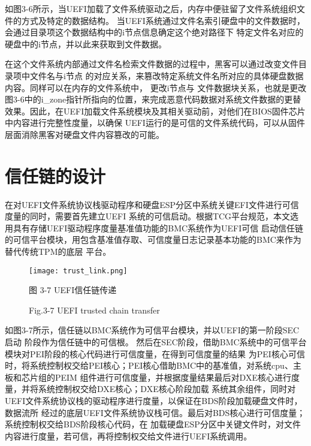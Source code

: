 如图3-6所示，当UEFI加载了文件系统驱动之后，内存中便驻留了文件系统组织文件的方式及特定的数据结构。
当UEFI系统通过文件名索引硬盘中的文件数据时，会通过目录项这个数据结构中的i节点信息确定这个绝对路径下
特定文件名对应的硬盘中的i节点，并以此来获取到文件数据。
\par 在这个文件系统内部通过文件名检索文件数据的过程中，黑客可以通过改变文件目录项中文件名与i节点
的对应关系，来篡改特定系统文件名所对应的具体硬盘数据内容\cite{chinese15}。同样可以在内存的文件系统中，
更改i节点与
文件数据块关系，也就是更改图3-6中的i\_zone指针所指向的位置，来完成恶意代码数据对系统文件数据的更替
效果。因此，在UEFI加载文件系统模块及其相关驱动前，对他们在BIOS固件芯片中内容进行完整性度量，以确保
UEFI运行的是可信的文件系统代码，可以从固件层面消除黑客对硬盘文件内容篡改的可能。

%
%
\section{信任链的设计}
在对UEFI文件系统协议栈驱动程序和硬盘ESP分区中系统关键EFI文件进行可信度量的同时，需要首先建立UEFI
系统的可信启动。根据TCG平台规范，本文选用具有存储UEFI驱动程序度量基准值功能的BMC系统作为UEFI可信
启动信任链的可信平台模块\cite{chinese5}，用包含基准值存取、可信度量日志记录基本功能的BMC来作为替代传统TPM的底层
平台。

\begin{figure}[htb]
    \vspace{0cm}   
    \setlength{\abovecaptionskip}{0.3cm}
	\centering
    \texttt{[image: trust\_link.png]}
    \caption*{图 3-7 UEFI信任链传递}
    \setlength{\belowcaptionskip}{-0.7cm}
    \caption*{Fig.3-7 UEFI trusted chain transfer}
\end{figure}

如图3-7所示，信任链以BMC系统作为可信平台模块\cite{chinese28}，并以UEFI的第一阶段SEC启动
阶段作为信任链中的可信根。
然后在SEC阶段，借助BMC系统中的可信平台模块对PEI阶段的核心代码进行可信度量，在得到可信度量的结果
为PEI核心可信时，将系统控制权交给PEI核心；PEI核心借助BMC中的基准值，对系统cpu、主板和芯片组的PEIM
组件进行可信度量，并根据度量结果最后对DXE核心进行度量，并将系统控制权交给DXE核心；DXE核心阶段加载
系统其余组件，同时对UEFI文件系统协议栈的驱动程序进行度量，以保证在BDS阶段加载硬盘文件时，数据流所
经过的底层UEFI文件系统协议栈可信。最后对BDS核心进行可信度量；系统控制权交给BDS阶段核心代码，在
加载硬盘ESP分区中关键文件时，对文件内容进行度量，若可信，再将控制权交给文件进行UEFI系统调用\cite{chinese12}。

